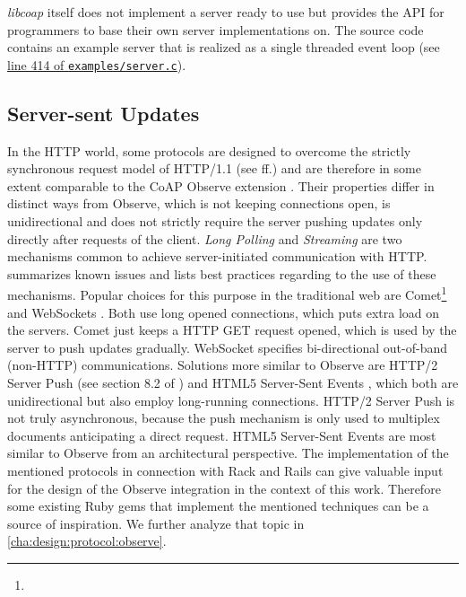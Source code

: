 
			\emph{libcoap} itself does not implement a server ready to use but
			provides the \ac{API} for programmers to base their own server
			implementations on. The source code contains an example server that
			is realized as a single threaded event loop (see
			\href{http://sourceforge.net/p/libcoap/code/ci/d48ab449fd05801e574e4966023589ed7dac500b/tree/examples/server.c#l414}{line
			414 of \texttt{examples/server.c}}).

	\subsection{Server-sent Updates}
	\label{cha:background:coap:observe}


		In the \ac{HTTP} world, some protocols are designed to overcome the
		strictly synchronous request model of HTTP/1.1 (see \cite{http-0} ff.)
		and are therefore in some extent comparable to the \ac{CoAP} Observe
		extension \cite{observe}. Their properties differ in distinct ways from
		Observe, which is not keeping connections open, is unidirectional and
		does not strictly require the server pushing updates only directly
		after requests of the client. \emph{Long Polling} and \emph{Streaming}
		are two mechanisms common to achieve server-initiated communication
		with \ac{HTTP}. \cite{http-bidir} summarizes known issues and lists
		best practices regarding to the use of these mechanisms. Popular
		choices for this purpose in the traditional web are
		Comet\footnote{\urlComet} and WebSockets \cite{websocket}. Both use
		long opened connections, which puts extra load on the servers. Comet
		just keeps a \ac{HTTP} GET request opened, which is used by the server
		to push updates gradually. WebSocket specifies bi-directional
		out-of-band (non-\ac{HTTP}) communications. Solutions more similar to
		Observe are \ac{HTTP}/2 Server Push (see section 8.2 of \cite{http2})
		and \acs{HTML5} Server-Sent Events \cite{sse}, which both are
		unidirectional but also employ long-running connections. \ac{HTTP}/2
		Server Push is not truly asynchronous, because the push mechanism is
		only used to multiplex documents anticipating a direct request.
		\acs{HTML5} Server-Sent Events are most similar to Observe from an
		architectural perspective. The implementation of the mentioned
		protocols in connection with Rack and \ac{Rails} can give valuable
		input for the design of the Observe integration in the context of this
		work. Therefore some existing Ruby gems that implement the mentioned
		techniques can be a source of inspiration. We further analyze that
		topic in \autoref{cha:design:protocol:observe}.

